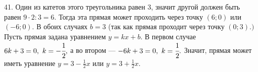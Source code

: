 41. Один из катетов этого треугольника равен 3, значит другой должен быть равен $9\cdot2:3=6.$ Тогда эта прямая может проходить через точку $(6;0)$ или $(-6;0).$ В обоих случаях $b=3$ (так как прямая проходит через точку $(0;3).)$ Пусть прямая задана уравнением $y=kx+b.$ В первом случае $6k+3=0,\ k=-\cfrac{1}{2},$ а во втором --- $-6k+3=0,\ k=\cfrac{1}{2}.$ Значит, прямая может иметь уравнение $y=3-\frac{1}{2}x$ или $y=3+\frac{1}{2}x.$\\
